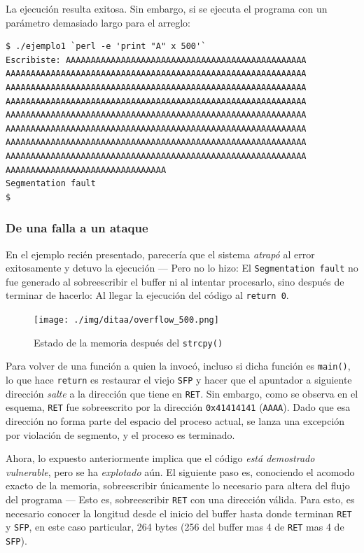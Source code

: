 \documentclass[11pt,fleqn]{book} %
\begin{document}
La ejecución resulta exitosa. Sin embargo, si se ejecuta el programa con un
parámetro demasiado largo para el arreglo:


\begin{verbatim}
$ ./ejemplo1 `perl -e 'print "A" x 500'`
Escribiste: AAAAAAAAAAAAAAAAAAAAAAAAAAAAAAAAAAAAAAAAAAAAAAAA
AAAAAAAAAAAAAAAAAAAAAAAAAAAAAAAAAAAAAAAAAAAAAAAAAAAAAAAAAAAA
AAAAAAAAAAAAAAAAAAAAAAAAAAAAAAAAAAAAAAAAAAAAAAAAAAAAAAAAAAAA
AAAAAAAAAAAAAAAAAAAAAAAAAAAAAAAAAAAAAAAAAAAAAAAAAAAAAAAAAAAA
AAAAAAAAAAAAAAAAAAAAAAAAAAAAAAAAAAAAAAAAAAAAAAAAAAAAAAAAAAAA
AAAAAAAAAAAAAAAAAAAAAAAAAAAAAAAAAAAAAAAAAAAAAAAAAAAAAAAAAAAA
AAAAAAAAAAAAAAAAAAAAAAAAAAAAAAAAAAAAAAAAAAAAAAAAAAAAAAAAAAAA
AAAAAAAAAAAAAAAAAAAAAAAAAAAAAAAAAAAAAAAAAAAAAAAAAAAAAAAAAAAA
AAAAAAAAAAAAAAAAAAAAAAAAAAAAAAAA
Segmentation fault
$
\end{verbatim}
\subsubsection{De una falla a un ataque}
\label{sec-5-6-1-3}


En el ejemplo recién presentado, parecería que el sistema \emph{atrapó} al
error exitosamente y detuvo la ejecución — Pero no lo hizo: El
\texttt{Segmentation fault} no fue generado al sobreescribir el buffer ni al
intentar procesarlo, sino después de terminar de hacerlo: Al llegar
la ejecución del código al \texttt{return 0}.

\begin{figure}[htb]
\centering
\texttt{[image: ./img/ditaa/overflow\_500.png]}
\caption{\label{MEM_overflow_500}Estado de la memoria después del \texttt{strcpy()}}
\end{figure}

Para volver de una función a quien la invocó, incluso si dicha
función es \texttt{main()}, lo que hace \texttt{return} es restaurar el viejo \texttt{SFP}
y hacer que el apuntador a siguiente dirección \emph{salte} a la
dirección que tiene en \texttt{RET}. Sin embargo, como se observa en el
esquema, \texttt{RET} fue sobreescrito por la dirección \texttt{0x41414141}
(\texttt{AAAA}). Dado que esa dirección no forma parte del espacio del
proceso actual, se lanza una excepción por violación de segmento, y
el proceso es terminado.

Ahora, lo expuesto anteriormente implica que el código \emph{está demostrado vulnerable}, pero se ha \emph{explotado} aún. El siguiente paso es,
conociendo el acomodo exacto de la memoria, sobreescribir únicamente
lo necesario para altera del flujo del programa — Esto es,
sobreescribir \texttt{RET} con una dirección válida. Para esto, es necesario
conocer la longitud desde el inicio del buffer hasta donde terminan
\texttt{RET} y \texttt{SFP}, en este caso particular, 264 bytes (256 del buffer mas 4 de
\texttt{RET} mas 4 de \texttt{SFP}).
\end{document}
